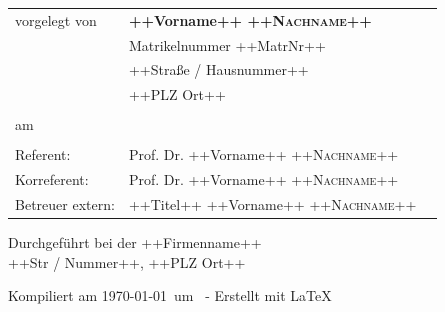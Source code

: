 %
\begin{small}
\begin{tabular}[h]{p{4cm}l l}
	vorgelegt von        & \textbf{++Vorname++ \textsc{++Nachname++}} \\ 
	                     & Matrikelnummer ++MatrNr++ \\
                	     & ++Straße / Hausnummer++ \\
	                     & ++PLZ Ort++ \\
	                     & \\
	am                   & \thedate \\
                	     & \\
	Referent:            & Prof. Dr. ++Vorname++ \textsc{++Nachname++}\\
	Korreferent:         & Prof. Dr. ++Vorname++ \textsc{++Nachname++}\\
	Betreuer extern:     & ++Titel++ ++Vorname++ \textsc{++Nachname++}\\
\end{tabular}
%
\vspace{15pt}
%
\begin{center}
	Durchgeführt bei der ++Firmenname++\\
	++Str / Nummer++, ++PLZ Ort++
\end{center}
\end{small}
%
\vspace{15pt}
%
\begin{center}
	\textcolor[gray]{0.4}{\tiny Kompiliert am \today ~um \currenttime ~- Erstellt mit \LaTeX}
\end{center}
%
\restoregeometry %